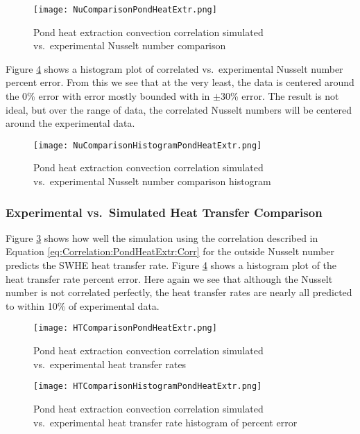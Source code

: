 	\begin{figure}
		\centering
		\texttt{[image: NuComparisonPondHeatExtr.png]}
		\caption{Pond heat extraction convection correlation simulated vs.\ experimental Nusselt number comparison}
		\label{fig:Correlation:PondHeatExtr:NuComparison}
	\end{figure}
	
Figure \ref{fig:Correlation:PondHeatExtr:HTComparisonHistogram} shows a histogram plot of correlated vs.\ experimental Nusselt number percent error. From this we see that at the very least, the data is centered around the 0\% error with error mostly bounded with in $\pm30$\% error. The result is not ideal, but over the range of data, the correlated Nusselt numbers will be centered around the experimental data.
	
	\begin{figure}
		\centering
		\texttt{[image: NuComparisonHistogramPondHeatExtr.png]}
		\caption{Pond heat extraction convection correlation simulated vs.\ experimental Nusselt number comparison histogram}
		\label{fig:Correlation:PondHeatExtr:NuComparisonHistogram}
	\end{figure}
			
\subsubsection{Experimental vs.\ Simulated Heat Transfer Comparison}
		
Figure \ref{fig:Correlation:PondHeatExtr:HTComparison} shows how well the simulation using the correlation described in Equation \ref{eq:Correlation:PondHeatExtr:Corr} for the outside Nusselt number predicts the SWHE heat transfer rate. Figure \ref{fig:Correlation:PondHeatExtr:HTComparisonHistogram} shows a histogram plot of the heat transfer rate percent error. Here again we see that although the Nusselt number is not correlated perfectly, the heat transfer rates are nearly all predicted to within 10\% of experimental data.
		
\begin{figure}
	\centering
	\texttt{[image: HTComparisonPondHeatExtr.png]}
	\caption{Pond heat extraction convection correlation simulated vs.\ experimental heat transfer rates}
	\label{fig:Correlation:PondHeatExtr:HTComparison}
\end{figure}

\begin{figure}
	\centering
	\texttt{[image: HTComparisonHistogramPondHeatExtr.png]}
	\caption{Pond heat extraction convection correlation simulated vs.\ experimental heat transfer rate histogram of percent error}
	\label{fig:Correlation:PondHeatExtr:HTComparisonHistogram}
\end{figure}
	
